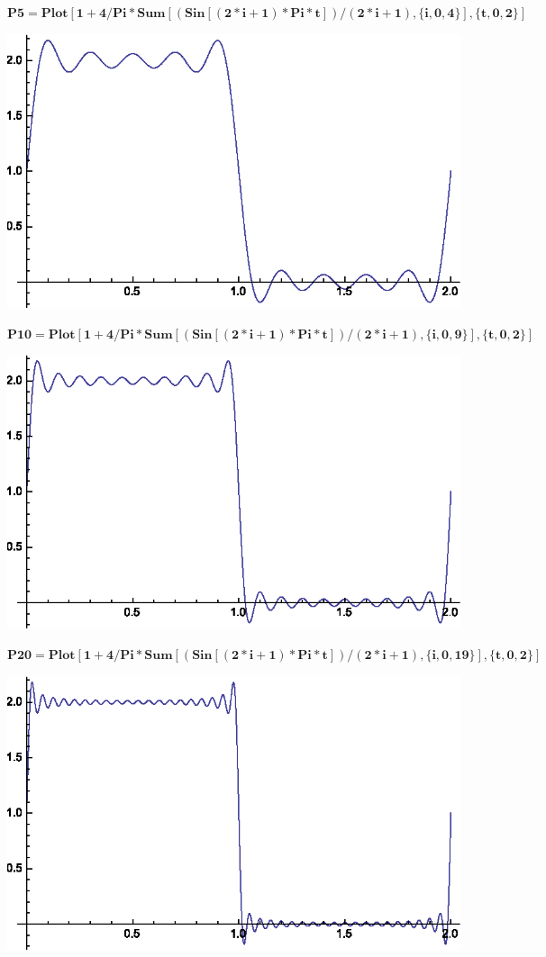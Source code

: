 \documentclass{article}
\begin{document}
\begin{doublespace}
\noindent\(\pmb{\text{P5}=\text{Plot}[1+4/\text{Pi}*\text{Sum}[(\text{Sin}[(2*i+1)*\text{Pi}*t])/(2*i+1),\{i,0,4\}],\{t,0,2\}]}\)
\end{doublespace}

\includegraphics{ex10_gr3.eps}

\begin{doublespace}
\noindent\(\pmb{\text{P10}=\text{Plot}[1+4/\text{Pi}*\text{Sum}[(\text{Sin}[(2*i+1)*\text{Pi}*t])/(2*i+1),\{i,0,9\}],\{t,0,2\}]}\)
\end{doublespace}

\includegraphics{ex10_gr4.eps}

\begin{doublespace}
\noindent\(\pmb{\text{P20}=\text{Plot}[1+4/\text{Pi}*\text{Sum}[(\text{Sin}[(2*i+1)*\text{Pi}*t])/(2*i+1),\{i,0,19\}],\{t,0,2\}]}\)
\end{doublespace}

\includegraphics{ex10_gr5.eps}
\end{document}

